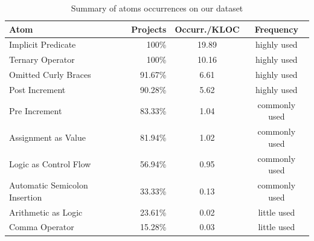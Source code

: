 



\begin{table}[ht]
\centering
\caption{Summary of atoms occurrences on our dataset}
\setlength\tabcolsep{2pt} %
\begin{tabular}{lrcc}
  \toprule
Atom & Projects & Occurr./KLOC & Frequency \\ 
  \midrule
Implicit Predicate & 100\% & 19.89 &  highly used \\ 
  Ternary Operator & 100\% & 10.16 &  highly used \\ 
  Omitted Curly Braces & 91.67\% & 6.61 &  highly used \\ 
  Post Increment & 90.28\% & 5.62 &  highly used \\ 
  Pre Increment & 83.33\% & 1.04 & commonly used \\ 
  Assignment as Value & 81.94\% & 1.02 & commonly used \\ 
  Logic as Control Flow & 56.94\% & 0.95 & commonly used \\ 
  Automatic Semicolon Insertion & 33.33\% & 0.13 & commonly used \\ 
  Arithmetic as Logic & 23.61\% & 0.02 & little used \\ 
  Comma Operator & 15.28\% & 0.03 & little used \\ 
   \bottomrule
\end{tabular}
\label{tab:occurrences-summary}
\end{table}


